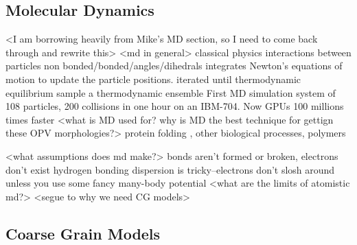 \subsection*{Molecular Dynamics}
<I am borrowing heavily from Mike's MD section, so I need to come back through and rewrite this>
<md in general>
classical physics
interactions between particles
non bonded/bonded/angles/dihedrals
integrates Newton's equations of motion to update the particle positions.
iterated until thermodynamic equilibrium
sample a thermodynamic ensemble
First MD simulation \cite{Alder1957} system of 108 particles, 200 collisions in one hour on an IBM-704.
Now GPUs 100 millions times faster
<what is MD used for? why is MD the best technique for gettign these OPV morphologies?>
protein folding \cite{levitt75}, other biological processes, polymers \cite{Gartner2019a}


<what assumptions does md make?>
bonds aren't formed or broken, electrons don't exist
hydrogen bonding
dispersion is tricky--electrons don't slosh around unless you use some fancy many-body potential
<what are the limits of atomistic md?>
<segue to why we need CG models>

\subsection*{Coarse Grain Models}

